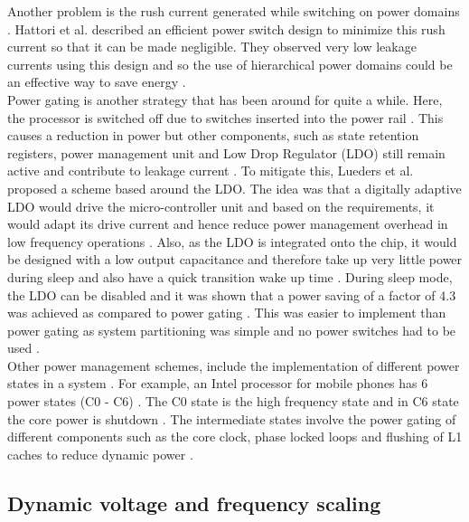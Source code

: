 \documentclass[journal]{IEEEtran}
\begin{document}
Another problem is the rush current generated while switching on power domains \cite{HierarchicalPower}. Hattori et al. \cite{HierarchicalPower} described an efficient power switch design to minimize this rush current so that it can be made negligible. They observed very low leakage currents using this design and so the use of hierarchical power domains could be an effective way to save energy \cite{HierarchicalPower}. \\

Power gating is another strategy that has been around for quite a while. Here, the processor is switched off due to switches inserted into the power rail \cite{LDO}. This causes a reduction in power but other components, such as state retention registers, power management unit and Low Drop Regulator (LDO) still remain active and contribute to leakage current \cite{LDO}. To mitigate this, Lueders et al. \cite{LDO} proposed a scheme based around the LDO. The idea was that a digitally adaptive LDO would drive the micro-controller unit and based on the requirements, it would adapt its drive current and hence reduce power management overhead in low frequency operations \cite{LDO}. Also, as the LDO is integrated onto the chip, it would be designed with a low output capacitance and therefore take up very little power during sleep and also have a quick transition wake up time \cite{LDO}. During sleep mode, the LDO can be disabled and it was shown that a power saving of a factor of 4.3 was achieved as compared to power gating \cite{LDO}. This was easier to implement than power gating as system partitioning was simple and no power switches had to be used \cite{LDO}. \\

Other power management schemes, include the implementation of different power states in a system \cite{Intel}. For example, an Intel processor for mobile phones has 6 power states (C0 - C6) \cite{Intel}. The C0 state is the high frequency state and in C6 state the core power is shutdown \cite{Intel}. The intermediate states involve the power gating of different components such as the core clock, phase locked loops and flushing of L1 caches to reduce dynamic power \cite{Intel}.   


\subsection{Dynamic voltage and frequency scaling}
\end{document}
